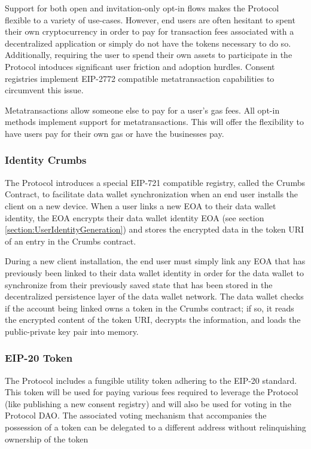 Support for both open and invitation-only opt-in flows makes the Protocol flexible to a variety of use-cases. However, end users are often hesitant to 
spent their own cryptocurrency in order to pay for transaction fees associated with a decentralized application or simply do not have the tokens 
necessary to do so. Additionally, requiring the user to spend their own assets to participate in the Protocol intoduces significant user friction and
adoption hurdles. Consent registries implement EIP-2772 compatible metatransaction capabilities to circumvent this issue. 

Metatransactions allow someone else to pay for a user's gas fees. All opt-in methods  implement support for metatransactions. This will offer the 
flexibility to have users pay for their own gas or have the businesses pay.  

\subsubsection{Identity Crumbs}
\label{section:Crumbs}

The Protocol introduces a special EIP-721 compatible registry, called the Crumbs Contract, to facilitate data wallet synchronization when an end user 
installs the client on a new device. When a user links a new EOA to their data wallet identity, the EOA encrypts their data wallet identity EOA (see section
\ref{section:UserIdentityGeneration}) and stores the encrypted data in the token URI of an entry in the Crumbs contract. 

During a new client installation, the end user must simply link any EOA that has previously been linked to their data wallet identity in order for the data 
wallet to synchronize from their previously saved state that has been stored in the decentralized persistence layer of the data wallet network. The data wallet
checks if the account being linked owns a token in the Crumbs contract; if so, it reads the encrypted content of the token URI, decrypts the information, and loads 
the public-private key pair into memory. 

\subsubsection{EIP-20 Token}
\label{section:Token}
The Protocol includes a fungible utility token adhering to the EIP-20 standard. This token will be used for paying various fees required to leverage
the Protocol (like publishing a new consent registry) and will also be used for voting in the Protocol DAO. The associated voting mechanism that 
accompanies the possession of a token can be delegated to a different address without relinquishing ownership of the token


